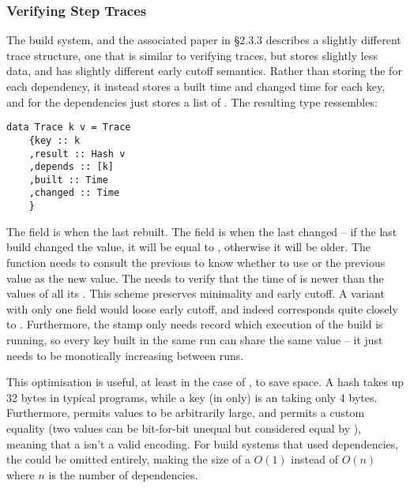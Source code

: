 \subsubsection{Verifying Step Traces}\label{sec-step-traces}

The \Shake build system, and the associated paper \cite{mitchell2012shake} in \S2.3.3 describes a slightly different trace structure, one that is similar to verifying traces, but stores slightly less data, and has slightly different early cutoff semantics. Rather than storing the  for each dependency, it instead stores a built time and changed time for each key, and for the dependencies just stores a list of . The resulting  type ressembles:

\begin{verbatim}
data Trace k v = Trace
    {key :: k
    ,result :: Hash v
    ,depends :: [k]
    ,built :: Time
    ,changed :: Time
    }
\end{verbatim}

The  field is when the  last rebuilt. The  field is when the  last changed -- if the last build changed the value, it will be equal to , otherwise it will be older. The  function needs to consult the previous  to know whether to use  or the previous  value as the new  value. The  needs to verify that the  time of  is newer than the  values of all its . This scheme preserves minimality and early cutoff. A variant with only one  field would loose early cutoff, and indeed corresponds quite closely to \Make. Furthermore, the  stamp only needs record which execution of the build is running, so every key built in the same run can share the same  value -- it just needs to be monotically increasing between runs.

This optimisation is useful, at least in the case of \Shake, to save space. A hash takes up 32 bytes in typical programs, while a key (in \Shake only) is an  taking only 4 bytes. Furthermore, \Shake permits values to be arbitrarily large, and permits a custom equality (two values can be bit-for-bit unequal but considered equal by \Shake), meaning that a  isn't a valid encoding. For build systems that used  dependencies, the  could be omitted entirely, making the size of a  $O(1)$ instead of $O(n)$ where $n$ is the number of dependencies.

